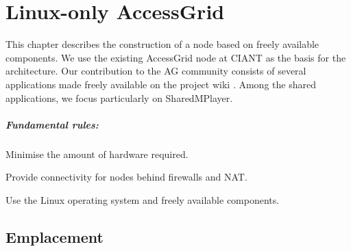 \chapter{Linux-only AccessGrid}\label{kap:LinuxNode}

This chapter describes the construction of a node based on freely available components. We use the existing AccessGrid node at CIANT as the basis for the architecture. Our contribution to the AG community consists of several applications made freely available on the project wiki \cite{CIANT-AGnodeWiki}. Among the shared applications, we focus particularly on SharedMPlayer.

\paragraph*{Fundamental rules:}
\begin{paklist}
\item Minimise the amount of hardware required.
\item Provide connectivity for nodes behind firewalls and NAT.
\item Use the Linux operating system and freely available components.
\end{paklist}

\section{Emplacement}

